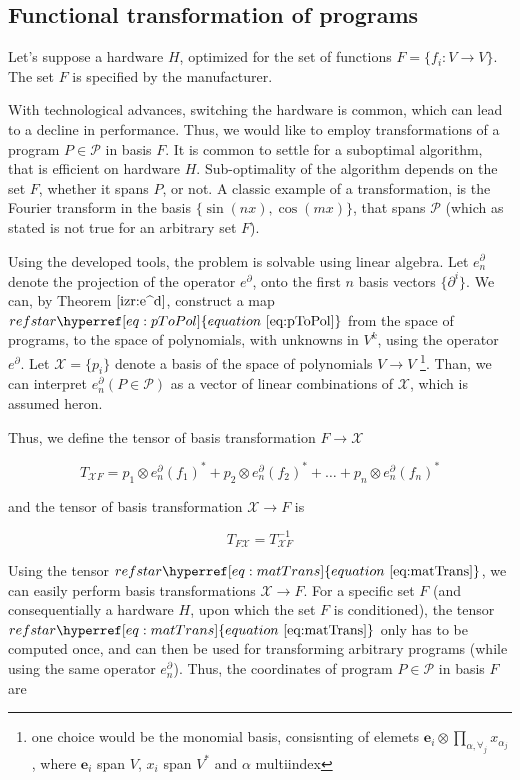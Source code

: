\documentclass{article}
\makeatletter
\newcommand{\e}{\mathbf{e}}
\newcommand{\X}{\mathcal{X}}
\newcommand{\dP}{\mathcal{P}}
\newcommand{\D}{\partial}
\let\originaleqref\eqref %
\renewcommand{\eqref}[1]{%
  \begingroup%
  \let\ref\@refstar%
  \hyperref[#1]{%
    equation%
    ~\originaleqref{#1}%
  }%
  \endgroup
}
\makeatother
\begin{document}
   \subsection{Functional transformation of programs}\label{sec:FTP}
   
   Let's suppose a hardware $H$, optimized for the set of functions
   $F=\{f_i:V\to V\}$. The set $F$ is specified by the manufacturer.  
   
   With technological advances, switching the hardware is common, which can lead
   to a decline in performance.  Thus, we would like to employ transformations
   of a program $P\in\dP$ in basis $F$. It is common to settle for a suboptimal
   algorithm, that is efficient on hardware $H$. Sub-optimality of the algorithm
   depends on the set $F$, whether it spans $P$, or not. A classic example of a
   transformation, is the Fourier transform in the basis $\{\sin(nx),
   \cos(mx)\}$, that spans $\dP$ (which as stated is not true for an arbitrary
   set $F$).
   
   Using the developed tools, the problem is solvable using linear algebra. Let
   $e^\D_n$ denote the projection of the operator $e^\D$, onto the first $n$
   basis vectors $\{\D^i\}$. We can, by Theorem $\ref{izr:e^d}$, construct a map
   $\eqref{eq:pToPol}$ from the space of programs, to the space of polynomials,
   with unknowns in $V^k$, using the operator $e^\D$. Let $\X=\{p_i\}$ denote a basis of
   the space of polynomials $V\to V$ \footnote{one choice would be the monomial basis,
   consisnting of elemets $\e_i\otimes\prod\limits_{\alpha,\forall_j}
   x_{\alpha_j}$, where $\e_i$ span $V$, $x_i$ span $V^*$ and $\alpha$
   multiindex}. Than, we can interpret $e^\D_n(P\in\dP)$ as a vector of linear combinations of $\X$, which is assumed heron.
  
  Thus, we define the tensor of basis transformation $F\to\X$
  
  \begin{equation}\label{eq:matTransF}
  T_{\X F}=
  p_1\otimes e_n^\D(f_1)^* + p_2\otimes e_n^\D(f_2)^* + \ldots + p_n\otimes e_n^\D(f_n)^*
  \end{equation}
  
  and the tensor of basis transformation $\X\to F$ is
  
  \begin{equation}\label{eq:matTrans}
  T_{F\X}=T_{\X F}^{-1}
  \end{equation}
  
  Using the tensor $\eqref{eq:matTrans}$, we can easily perform basis transformations $\X\to F$. For a specific set $F$ (and consequentially a hardware $H$, upon which the set $F$ is conditioned), the tensor $\eqref{eq:matTrans}$ only has to be computed once, and can then be used for transforming arbitrary programs (while using the same operator $e^\D_n$).
  Thus, the coordinates of program $P\in\dP$ in basis $F$ are
  
\end{document}
